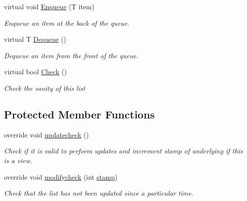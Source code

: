 \begin{DoxyCompactItemize}
virtual void \hyperlink{class_c5_1_1_linked_list_af48722fbdb04653c4dc7f6bf8af7562c}{Enqueue} (T item)
\begin{DoxyCompactList}\small\item\em Enqueue an item at the back of the queue. \end{DoxyCompactList}\item 
virtual T \hyperlink{class_c5_1_1_linked_list_a5175726bb9e1356d3442b427acac06b5}{Dequeue} ()
\begin{DoxyCompactList}\small\item\em Dequeue an item from the front of the queue. \end{DoxyCompactList}\item 
virtual bool \hyperlink{class_c5_1_1_linked_list_a9e151b01ae99dd3f5472e0638243e7ec}{Check} ()
\begin{DoxyCompactList}\small\item\em Check the sanity of this list \end{DoxyCompactList}\end{DoxyCompactItemize}
\subsection*{Protected Member Functions}
\begin{DoxyCompactItemize}
\item 
override void \hyperlink{class_c5_1_1_linked_list_a1a74556032b0297634bda3f5e617e89d}{updatecheck} ()
\begin{DoxyCompactList}\small\item\em Check if it is valid to perform updates and increment stamp of underlying if this is a view. \end{DoxyCompactList}\item 
override void \hyperlink{class_c5_1_1_linked_list_aaba29831e0883a7bb02c5850a13323a7}{modifycheck} (int \hyperlink{class_c5_1_1_collection_base_ae13bd5b482306a49a4d10654a9b8b064}{stamp})
\begin{DoxyCompactList}\small\item\em Check that the list has not been updated since a particular time. \end{DoxyCompactList}\end{DoxyCompactItemize}
